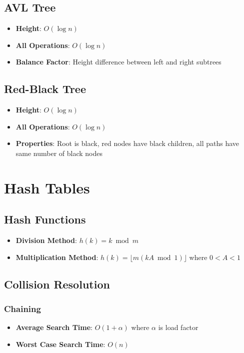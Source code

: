 \documentclass[11pt]{article}
\theoremstyle{definition}
\begin{document}
\subsection{AVL Tree}
\begin{itemize}
    \item \textbf{Height}: $O(\log n)$
    \item \textbf{All Operations}: $O(\log n)$
    \item \textbf{Balance Factor}: Height difference between left and right subtrees
\end{itemize}

\subsection{Red-Black Tree}
\begin{itemize}
    \item \textbf{Height}: $O(\log n)$
    \item \textbf{All Operations}: $O(\log n)$
    \item \textbf{Properties}: Root is black, red nodes have black children, all paths have same number of black nodes
\end{itemize}

\section{Hash Tables}

\subsection{Hash Functions}
\begin{itemize}
    \item \textbf{Division Method}: $h(k) = k \bmod m$
    \item \textbf{Multiplication Method}: $h(k) = \lfloor m(kA \bmod 1) \rfloor$ where $0 < A < 1$
\end{itemize}

\subsection{Collision Resolution}
\subsubsection{Chaining}
\begin{itemize}
    \item \textbf{Average Search Time}: $O(1 + \alpha)$ where $\alpha$ is load factor
    \item \textbf{Worst Case Search Time}: $O(n)$
\end{itemize}
\end{document}
